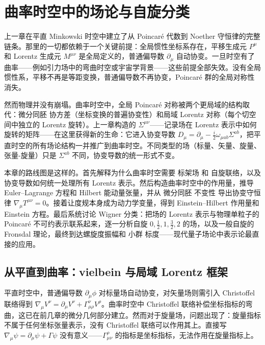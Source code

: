 \chapter{曲率时空中的场论与自旋分类}

上一章在平直 Minkowski 时空中建立了从 Poincaré 代数到 Noether 守恒律的完整链条。那里的一切都依赖于一个关键前提：全局惯性坐标系存在，平移生成元 $P^\mu$ 和 Lorentz 生成元 $M^{\mu\nu}$ 是全局定义的，普通偏导数 $\partial_\mu$ 自动协变。一旦时空有了曲率——例如引力场中的弯曲时空或宇宙学背景——这些前提全部失效。没有全局惯性系，平移不再是等距变换，普通偏导数不再协变，Poincaré 群的全局对称性消失。

然而物理并没有崩塌。曲率时空中，全局 Poincaré 对称被两个更局域的结构取代：微分同胚 协方差（坐标变换的普遍协变性）和局域 Lorentz 对称（每个切空间中独立的 Lorentz 旋转）。上一章构造的 $\Sigma^{\mu\nu}$——记录场在 Lorentz 表示中如何旋转的矩阵——在这里获得新的生命：它进入协变导数 $D_\mu=\partial_\mu-\frac{i}{2}\omega_{\mu ab}\Sigma^{ab}$，把平直时空的所有场论结构一并推广到曲率时空。不同类型的场（标量、矢量、旋量、张量-旋量）只是 $\Sigma^{ab}$ 不同，协变导数的统一形式不变。

本章的路线图是这样的。首先解释为什么曲率时空需要 标架场 和 自旋联络，以及协变导数如何统一处理所有 Lorentz 表示。然后构造曲率时空中的作用量，推导 Euler--Lagrange 方程和 Hilbert 能动量张量，并从 微分同胚 不变性 导出协变守恒律 $\nabla_\mu T^{\mu\nu}=0$。接着让度规本身成为动力学变量，得到 Einstein--Hilbert 作用量和 Einstein 方程。最后系统讨论 Wigner 分类：把场的 Lorentz 表示与物理单粒子的 Poincaré 不可约表示联系起来，逐一分析自旋 $0,\frac{1}{2},1,\frac{3}{2},2$ 的场，以及一般自旋的 Fronsdal 理论，最终到达螺旋度振幅和 小群 标度——现代量子场论中表示论最直接的应用。

\section{从平直到曲率：vielbein 与局域 Lorentz 框架}
平直时空中，普通偏导数 $\partial_\mu\phi$ 对标量场自动协变，对矢量场则需引入 Christoffel 联络得到 $\nabla_\mu V^\nu=\partial_\mu V^\nu+\Gamma^\nu_{\mu\rho}V^\rho$。曲率时空中 Christoffel 联络补偿坐标指标的弯曲，这已在前几章的微分几何部分建立。然而对于旋量场，问题出现了：旋量指标不属于任何坐标张量表示，没有 Christoffel 联络可以作用其上。直接写 $\nabla_\mu\psi=\partial_\mu\psi+\Gamma\psi$ 没有意义——$\Gamma^\rho_{\mu\nu}$ 的指标是坐标指标，无法作用在旋量指标上。

